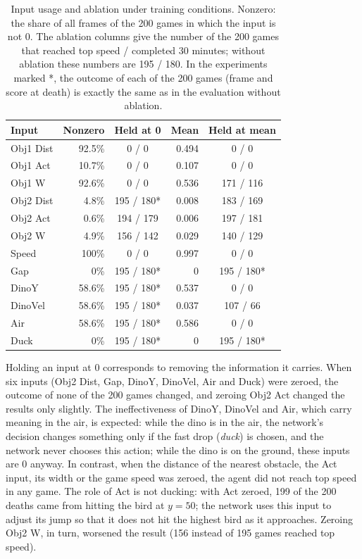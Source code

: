 \documentclass[11pt,a4paper]{article}
\begin{document}
\begin{table}[!htbp]
  \centering
  \small
  \caption{Input usage and ablation under training conditions. Nonzero: the share of all frames of the 200 games in which the input is not 0. The ablation columns give the number of the 200 games that reached top speed / completed 30 minutes; without ablation these numbers are 195 / 180. In the experiments marked *, the outcome of each of the 200 games (frame and score at death) is exactly the same as in the evaluation without ablation.}
  \label{tab:ablation}
  \begin{tabular}{@{}l r c r c@{}}
    \toprule
    Input & Nonzero & Held at 0 & Mean & Held at mean \\
    \midrule
    Obj1 Dist & 92.5\% & 0 / 0 & 0.494 & 0 / 0 \\
    Obj1 Act & 10.7\% & 0 / 0 & 0.107 & 0 / 0 \\
    Obj1 W & 92.6\% & 0 / 0 & 0.536 & 171 / 116 \\
    Obj2 Dist & 4.8\% & 195 / 180* & 0.008 & 183 / 169 \\
    Obj2 Act & 0.6\% & 194 / 179 & 0.006 & 197 / 181 \\
    Obj2 W & 4.9\% & 156 / 142 & 0.029 & 140 / 129 \\
    Speed & 100\% & 0 / 0 & 0.997 & 0 / 0 \\
    Gap & 0\% & 195 / 180* & 0 & 195 / 180* \\
    DinoY & 58.6\% & 195 / 180* & 0.537 & 0 / 0 \\
    DinoVel & 58.6\% & 195 / 180* & 0.037 & 107 / 66 \\
    Air & 58.6\% & 195 / 180* & 0.586 & 0 / 0 \\
    Duck & 0\% & 195 / 180* & 0 & 195 / 180* \\
    \bottomrule
  \end{tabular}
\end{table}
\FloatBarrier

Holding an input at 0 corresponds to removing the information it carries. When six inputs (Obj2 Dist, Gap, DinoY, DinoVel, Air and Duck) were zeroed, the outcome of none of the 200 games changed, and zeroing Obj2 Act changed the results only slightly. The ineffectiveness of DinoY, DinoVel and Air, which carry meaning in the air, is expected: while the dino is in the air, the network's decision changes something only if the fast drop (\emph{duck}) is chosen, and the network never chooses this action; while the dino is on the ground, these inputs are 0 anyway. In contrast, when the distance of the nearest obstacle, the Act input, its width or the game speed was zeroed, the agent did not reach top speed in any game. The role of Act is not ducking: with Act zeroed, 199 of the 200 deaths came from hitting the bird at ${y = 50}$; the network uses this input to adjust its jump so that it does not hit the highest bird as it approaches. Zeroing Obj2 W, in turn, worsened the result (156 instead of 195 games reached top speed).
\end{document}
